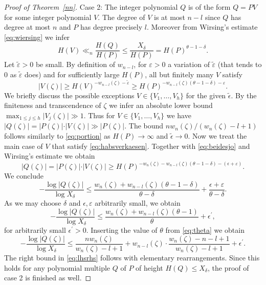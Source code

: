 \documentclass[12pt]{amsart}
\theoremstyle{definition}
\begin{document}
\begin{proof} [Proof of Theorem~\ref{nn}]
Case 2: The integer polynomial $Q$ is
of the form $Q=PV$ for some integer polynomial $V$. The 
degree of $V$ is at most $n-l$ since
$Q$ has degree at most $n$ and $P$ has degree precisely $l$. Moreover from Wirsing's estimate \eqref{eq:wiersing} we infer
\[
H(V)\ll_{n} \frac{H(Q)}{H(P)}\leq \frac{X_{\delta}}{H(P)}= H(P)^{\theta-1-\delta}.
\]
Let $\tilde{\varepsilon}>0$ be small. By definition of $w_{n-l}$, for $\varepsilon>0$ a variation of 
$\tilde{\varepsilon}$ (that tends to $0$ as $\tilde{\varepsilon}$ does) and for sufficiently large $H(P)$, 
all but finitely many $V$ satisfy
\begin{equation}  \label{eq:habsverkaesen}
\vert V(\zeta)\vert \geq H(V)^{-w_{n-l}(\zeta)-\tilde{\varepsilon}}\geq  H(P)^{-w_{n-l}(\zeta)(\theta-1-\delta)-\varepsilon}.
\end{equation}
We briefly discuss the possible exceptions 
$V\in\{V_{1},\ldots,V_{h}\}$ for the given $\tilde{\epsilon}$. 
By the finiteness and transcendence of $\zeta$ we infer an absolute lower bound $\max_{1\leq j\leq h} \vert V_{j}(\zeta)\vert \gg 1$. 
Thus for $V\in\{V_{1},\ldots,V_{h}\}$ we 
have $\vert Q(\zeta)\vert= \vert P(\zeta)\vert \cdot \vert V(\zeta)\vert \gg \vert P(\zeta)\vert$. 
The bound $nw_{n}(\zeta)/(w_{n}(\zeta)-l+1)$ follows similarly to \eqref{eq:portion} as $H(P)\to\infty$
and $\tilde{\epsilon}\to 0$. Now we treat the main case 
of $V$ that satisfy \eqref{eq:habsverkaesen}.
Together with \eqref{eq:beidesjo} and Wirsing's estimate we obtain
\[
\vert Q(\zeta)\vert = \vert P(\zeta)\vert\cdot \vert V(\zeta)\vert 
\geq H(P)^{-w_{n}(\zeta)-w_{n-l}(\zeta)(\theta-1-\delta)-(\epsilon+\varepsilon)}.
\]
We conclude
\[
-\frac{\log \vert Q(\zeta)\vert}{\log X_{\delta}} \leq 
\frac{w_{n}(\zeta)+w_{n-l}(\zeta)(\theta-1-\delta)}{\theta-\delta}+\frac{\epsilon+\varepsilon}{\theta-\delta}.
\]
As we may choose $\delta$ and $\epsilon, \varepsilon$ arbitrarily small, we obtain
\[
-\frac{\log \vert Q(\zeta)\vert}{\log X_{\delta}} \leq  
\frac{w_{n}(\zeta)+w_{n-l}(\zeta)(\theta-1)}{\theta}+\epsilon^{\prime},
\]
for arbitrarily small $\epsilon^{\prime}>0$. 
Inserting the value of $\theta$ from \eqref{eq:theta} we obtain
\[
-\frac{\log \vert Q(\zeta)\vert}{\log X_{\delta}} \leq 
\frac{nw_{n}(\zeta)}{w_{n}(\zeta)-l+1}+w_{n-l}(\zeta)\cdot \frac{w_{n}(\zeta)-n-l+1}{w_{n}(\zeta)-l+1}+\epsilon^{\prime}.
\]
The right bound in \eqref{eq:lhsrhs} follows with elementary rearrangements. 
Since this holds for any polynomial multiple $Q$ of $P$ of height $H(Q)\leq X_{\delta}$, 
the proof of case 2 is finished as well.
\end{proof}
\end{document}

